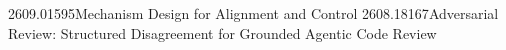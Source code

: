 \pathfinderpapers
  {2609.01595}{Mechanism Design for Alignment and Control}
  {2608.18167}{Adversarial Review: Structured Disagreement for Grounded Agentic Code Review}
\date{2026-09-25}
